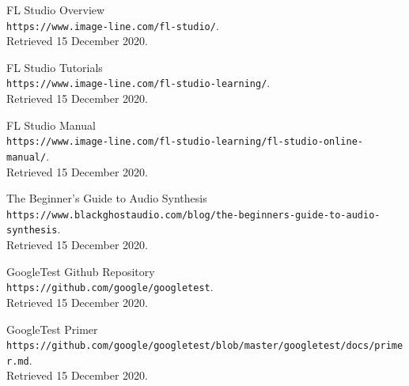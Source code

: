 \documentclass[a4paper,12pt]{report}
\begin{document}
\begin{thebibliography}{9}
FL Studio Overview
\\\texttt{https://www.image-line.com/fl-studio/}.\\
Retrieved 15 December 2020.

FL Studio Tutorials
\\\texttt{https://www.image-line.com\-/fl-studio-learning/}.\\
Retrieved 15 December 2020.

FL Studio Manual
\\\texttt{https://www.image-line.com\-/fl-studio-learning\-/fl-studio-online-manual/}.\\
Retrieved 15 December 2020.

The Beginner's Guide to Audio Synthesis
\\\texttt{https://www.blackghostaudio.com/blog\-/the-beginners-guide-to-audio-synthesis}.\\
Retrieved 15 December 2020.

GoogleTest Github Repository
\\\texttt{https://github.com/google/googletest}.\\
Retrieved 15 December 2020.

GoogleTest Primer
\\\texttt{https://github.com/google/googletest/blob/master/googletest/docs/primer.md}.\\
Retrieved 15 December 2020.

\end{thebibliography}
\cleardoublepage
\listoffigures
\cleardoublepage
{}
\lstlistoflistings
\end{document}
